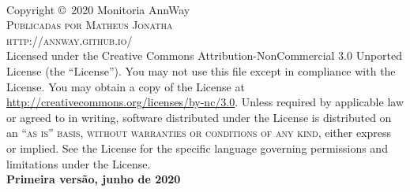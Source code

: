 \documentclass[11pt,fleqn]{book}
\begin{document}
\begingroup
\thispagestyle{empty} %
\vfill
\endgroup

\newpage
~\vfill
\thispagestyle{empty}

\noindent Copyright \copyright\ 2020 Monitoria AnnWay\\ %

\noindent \textsc{Publicadas por Matheus Jonatha}\\ %

\noindent  \textsc{http://annway.github.io/}\\ %

\noindent Licensed under the Creative Commons Attribution-NonCommercial 3.0 Unported License (the ``License''). You may not use this file except in compliance with the License. You may obtain a copy of the License at \url{http://creativecommons.org/licenses/by-nc/3.0}. Unless required by applicable law or agreed to in writing, software distributed under the License is distributed on an \textsc{``as is'' basis, without warranties or conditions of any kind}, either express or implied. See the License for the specific language governing permissions and limitations under the License.\\ %

\noindent \textbf{Primeira versão, junho de 2020} %




\pagestyle{empty} %

\tableofcontents %

\cleardoublepage %
\end{document}
